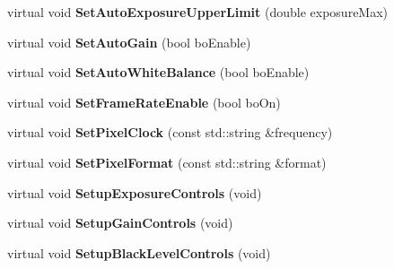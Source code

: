 \begin{DoxyCompactItemize}
\item 
\hypertarget{class_wizard_quick_setup_gen_i_cam_a925e8fc03054407fadf3692b37fe699f}{virtual void {\bfseries Set\+Auto\+Exposure\+Upper\+Limit} (double exposure\+Max)}\label{class_wizard_quick_setup_gen_i_cam_a925e8fc03054407fadf3692b37fe699f}

\item 
\hypertarget{class_wizard_quick_setup_gen_i_cam_a3981fb18557b28877c7d322abcae0faf}{virtual void {\bfseries Set\+Auto\+Gain} (bool bo\+Enable)}\label{class_wizard_quick_setup_gen_i_cam_a3981fb18557b28877c7d322abcae0faf}

\item 
\hypertarget{class_wizard_quick_setup_gen_i_cam_af313a34721f9175b032da8c9c1a2f28b}{virtual void {\bfseries Set\+Auto\+White\+Balance} (bool bo\+Enable)}\label{class_wizard_quick_setup_gen_i_cam_af313a34721f9175b032da8c9c1a2f28b}

\item 
\hypertarget{class_wizard_quick_setup_gen_i_cam_a563fa3937f5871c05ee3540208136fe7}{virtual void {\bfseries Set\+Frame\+Rate\+Enable} (bool bo\+On)}\label{class_wizard_quick_setup_gen_i_cam_a563fa3937f5871c05ee3540208136fe7}

\item 
\hypertarget{class_wizard_quick_setup_gen_i_cam_a295181212d5e46683114f6de6c578bc2}{virtual void {\bfseries Set\+Pixel\+Clock} (const std\+::string \&frequency)}\label{class_wizard_quick_setup_gen_i_cam_a295181212d5e46683114f6de6c578bc2}

\item 
\hypertarget{class_wizard_quick_setup_gen_i_cam_a344c025724cead85276f850cbd3b7e58}{virtual void {\bfseries Set\+Pixel\+Format} (const std\+::string \&format)}\label{class_wizard_quick_setup_gen_i_cam_a344c025724cead85276f850cbd3b7e58}

\item 
\hypertarget{class_wizard_quick_setup_gen_i_cam_aad3f95ca277aa4ffed89ec134c8738df}{virtual void {\bfseries Setup\+Exposure\+Controls} (void)}\label{class_wizard_quick_setup_gen_i_cam_aad3f95ca277aa4ffed89ec134c8738df}

\item 
\hypertarget{class_wizard_quick_setup_gen_i_cam_a6a306477f420fa7c4725bcd554b965fe}{virtual void {\bfseries Setup\+Gain\+Controls} (void)}\label{class_wizard_quick_setup_gen_i_cam_a6a306477f420fa7c4725bcd554b965fe}

\item 
\hypertarget{class_wizard_quick_setup_gen_i_cam_a551ca7711ad5d75824d504dfb470aeb5}{virtual void {\bfseries Setup\+Black\+Level\+Controls} (void)}\label{class_wizard_quick_setup_gen_i_cam_a551ca7711ad5d75824d504dfb470aeb5}


\end{DoxyCompactItemize}
